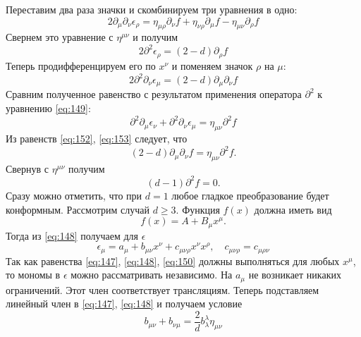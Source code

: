 \documentclass[a4paper,12pt]{article}
\theoremstyle{definition}
\theoremstyle{definition}
\theoremstyle{definition}
\begin{document}
Переставим два раза значки и скомбинируем три уравнения в одно:
\begin{equation}
  \label{eq:150}
  2\partial_{\mu}\partial_{\nu}\epsilon_{\rho}=\eta_{\mu\rho}\partial_{\nu} f+\eta_{\nu\rho}\partial_{\mu}f-\eta_{\mu\nu}\partial_{\rho}f
\end{equation}
Свернем это уравнение с $\eta^{\mu\nu}$ и получим
\begin{equation}
  \label{eq:151}
  2\partial^2 \epsilon_{\rho}=(2-d)\partial_{\rho}f
\end{equation}
Теперь продифференцируем его по $x^{\nu}$ и поменяем значок $\rho$ на $\mu$:
\begin{equation}
  \label{eq:152}
  2\partial^2 \partial_{\nu} \epsilon_{\mu}=(2-d)\partial_{\mu}\partial_{\nu} f
\end{equation}
Сравним полученное равенство с результатом применения оператора $\partial^2$ к уравнению \eqref{eq:149}:
\begin{equation}
  \label{eq:153}
  \partial^2 \partial_{\mu}\epsilon_{\nu}+\partial^2 \partial_{\nu}\epsilon_{\mu}=\eta_{\mu\nu}\partial^2 f
\end{equation}
Из равенств \eqref{eq:152}, \eqref{eq:153} следует, что
\begin{equation}
  \label{eq:154}
  (2-d)\partial_{\mu}\partial_{\nu}f=\eta_{\mu\nu}\partial^2 f.
\end{equation}
Свернув с $\eta^{\mu\nu}$ получим
\begin{equation}
  \label{eq:155}
  (d-1)\partial^2 f =0.
\end{equation}
Сразу можно отметить, что при $d=1$ любое гладкое преобразование будет конформным. Рассмотрим случай $d\geq 3$. Функция $f(x)$ должна иметь вид
\begin{equation}
  \label{eq:156}
  f(x)=A+B_{\mu}x^{\mu}.
\end{equation}
Тогда из \eqref{eq:148} получаем для $\epsilon$
\begin{equation}
  \label{eq:157}
  \epsilon_{\mu}=a_{\mu}+b_{\mu\nu}x^{\nu} +c_{\mu\nu\rho}x^{\nu}x^{\rho},\quad c_{\mu\nu\rho}=c_{\mu\rho\nu}
\end{equation}
Так как равенства \eqref{eq:147}, \eqref{eq:148}, \eqref{eq:150} должны выполняться для любых $x^{\mu}$, то мономы в $\epsilon$ можно рассматривать независимо. На $a_{\mu}$ не возникает никаких ограничений. Этот член соответствует трансляциям. Теперь подставляем линейный член в \eqref{eq:147}, \eqref{eq:148} и получаем условие
\begin{equation}
  \label{eq:158}
  b_{\mu\nu}+b_{\nu\mu}=\frac{2}{d}b^{\lambda}_{\lambda}\eta_{\mu\nu}
\end{equation}
\end{document}
